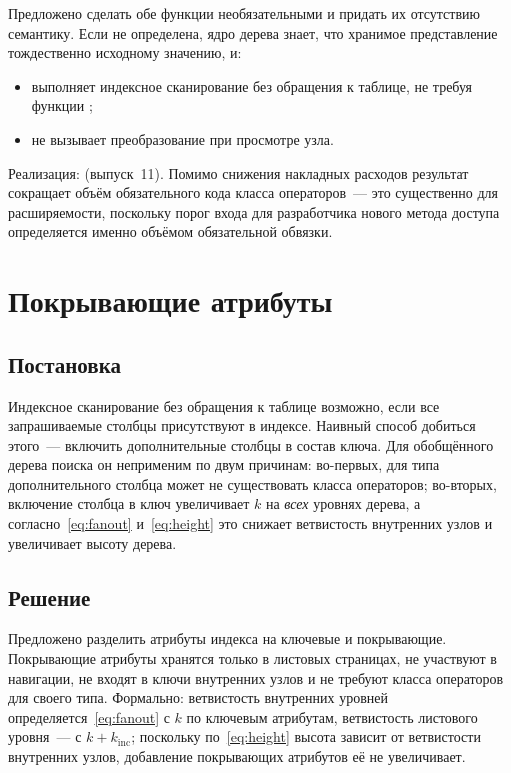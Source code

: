 Предложено сделать обе функции необязательными и придать их отсутствию
семантику. Если  не определена, ядро дерева знает, что хранимое
представление тождественно исходному значению, и:

\begin{itemize}
\item выполняет индексное сканирование без обращения к таблице, не требуя
      функции ;
\item не вызывает преобразование при просмотре узла.
\end{itemize}

Реализация:  (выпуск~11). Помимо снижения накладных расходов результат сокращает
объём обязательного кода класса операторов~--- это существенно для
расширяемости, поскольку порог входа для разработчика нового метода доступа
определяется именно объёмом обязательной обвязки.

\section{Покрывающие атрибуты}
\label{sec:include}

\subsection{Постановка}

Индексное сканирование без обращения к таблице возможно, если все запрашиваемые
столбцы присутствуют в индексе. Наивный способ добиться этого~--- включить
дополнительные столбцы в состав ключа. Для обобщённого дерева поиска он
неприменим по двум причинам: во-первых, для типа дополнительного столбца может
не существовать класса операторов; во-вторых, включение столбца в ключ
увеличивает $k$ на \emph{всех} уровнях дерева, а согласно~\eqref{eq:fanout}
и~\eqref{eq:height} это снижает ветвистость внутренних узлов и увеличивает
высоту дерева.

\subsection{Решение}

Предложено разделить атрибуты индекса на ключевые и покрывающие. Покрывающие
атрибуты хранятся только в листовых страницах, не участвуют в навигации, не
входят в ключи внутренних узлов и не требуют класса операторов для своего типа.
Формально: ветвистость внутренних уровней определяется~\eqref{eq:fanout} с
$k$ по ключевым атрибутам, ветвистость листового уровня~--- с $k+k_{\text{inc}}$;
поскольку по~\eqref{eq:height} высота зависит от ветвистости внутренних узлов,
добавление покрывающих атрибутов её не увеличивает.

